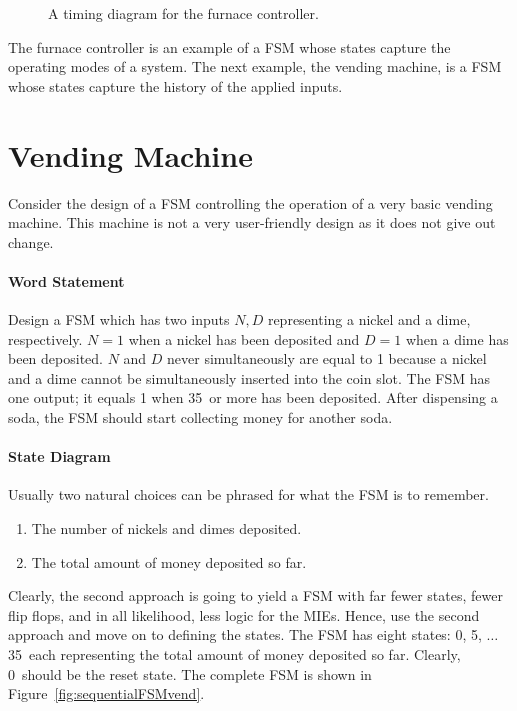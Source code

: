 \begin{figure}[ht]

\caption{A timing diagram for the furnace controller.}
\label{fig:sequentialFSMFurnaceTime}

\end{figure}

The furnace controller is an example of a FSM whose states capture
the operating modes of a system.  The next example, the vending
machine, is a FSM whose states capture the history of the applied
inputs.


\section{Vending Machine}
Consider the design of a FSM controlling the operation of a
very basic vending machine.  This machine is not a very user-friendly design
as it does not give out change.

\paragraph{Word Statement}
Design a FSM which has two inputs $N, D$ representing a nickel and a dime,
respectively.  $N=1$ when a nickel has been deposited and $D=1$ 
when a dime has been deposited. $N$ and $D$ never simultaneously are  
equal to 1 because a nickel and a dime cannot be simultaneously 
inserted into the coin slot.  The FSM has one output; it equals 1 
when 35\textcent~or more has been deposited.  After dispensing a
soda, the FSM should start collecting money for another soda.

\paragraph{State Diagram}
Usually two natural choices can be phrased for what the 
FSM is to remember.
\begin{enumerate}
\item The number of nickels and dimes deposited.
\item The total amount of money deposited so far.
\end{enumerate}

Clearly, the second approach is going to yield a FSM with far fewer
states, fewer flip flops, and in all likelihood, less logic for the
MIEs.  Hence, use the second approach and move on to
defining the states.  The FSM has eight states:  
0\textcent, 5\textcent, $\ldots$ 35\textcent~each representing the total
amount of money deposited so far.  Clearly, 0\textcent~should be the 
reset state.  The complete FSM is shown in Figure~\ref{fig:sequentialFSMvend}.

